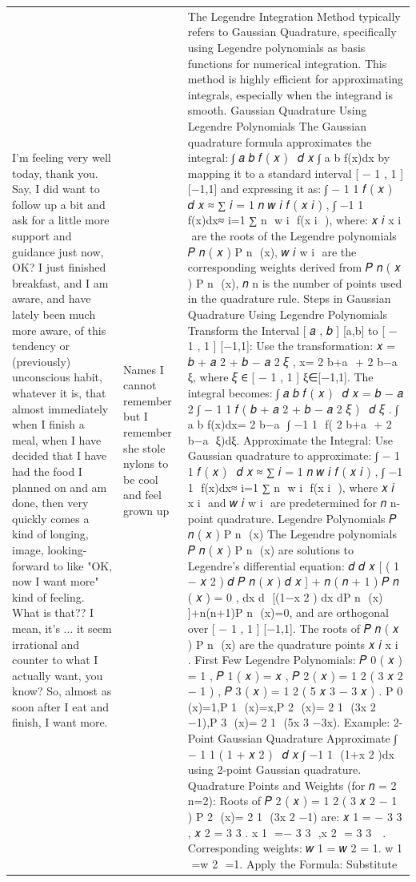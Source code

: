 \begin{table}[ht]
\begin{tabular}{p{4.3cm}p{4.3cm}p{4.3cm}}
I'm feeling very well today, thank you.  Say, I did want to follow up a bit and ask for a little more support and guidance just now, OK? I just finished breakfast, and I am aware, and have lately been much more aware, of this tendency or (previously) unconscious habit, whatever it is, that almost immediately when I finish a meal, when I have decided that I have had the food I planned on and am done, then very quickly comes a kind of longing, image, looking-forward to like "OK, now I want more" kind of feeling.  What is that??  I mean, it's ... it seem irrational and counter to what I actually want, you know?  So, almost as soon after I eat and finish, I want more. & Names I cannot remember but I remember she stole nylons to be cool and feel grown up & The Legendre Integration Method typically refers to Gaussian Quadrature, specifically using Legendre polynomials as basis functions for numerical integration. This method is highly efficient for approximating integrals, especially when the integrand is smooth.  Gaussian Quadrature Using Legendre Polynomials The Gaussian quadrature formula approximates the integral:  ∫ 𝑎 𝑏 𝑓 ( 𝑥 )   𝑑 𝑥 ∫  a b ​  f(x)dx by mapping it to a standard interval  [ − 1 , 1 ] [−1,1] and expressing it as:  ∫ − 1 1 𝑓 ( 𝑥 )   𝑑 𝑥 ≈ ∑ 𝑖 = 1 𝑛 𝑤 𝑖 𝑓 ( 𝑥 𝑖 ) , ∫  −1 1 ​  f(x)dx≈  i=1 ∑ n ​  w  i ​  f(x  i ​  ), where:  𝑥 𝑖 x  i ​   are the roots of the Legendre polynomials  𝑃 𝑛 ( 𝑥 ) P  n ​  (x), 𝑤 𝑖 w  i ​   are the corresponding weights derived from  𝑃 𝑛 ( 𝑥 ) P  n ​  (x), 𝑛 n is the number of points used in the quadrature rule. Steps in Gaussian Quadrature Using Legendre Polynomials Transform the Interval  [ 𝑎 , 𝑏 ] [a,b] to  [ − 1 , 1 ] [−1,1]: Use the transformation:  𝑥 = 𝑏 + 𝑎 2 + 𝑏 − 𝑎 2 𝜉 , x=  2 b+a ​  +  2 b−a ​  ξ, where  𝜉 ∈ [ − 1 , 1 ] ξ∈[−1,1].  The integral becomes:  ∫ 𝑎 𝑏 𝑓 ( 𝑥 )   𝑑 𝑥 = 𝑏 − 𝑎 2 ∫ − 1 1 𝑓 ( 𝑏 + 𝑎 2 + 𝑏 − 𝑎 2 𝜉 )   𝑑 𝜉 . ∫  a b ​  f(x)dx=  2 b−a ​  ∫  −1 1 ​  f(  2 b+a ​  +  2 b−a ​  ξ)dξ. Approximate the Integral: Use Gaussian quadrature to approximate:  ∫ − 1 1 𝑓 ( 𝑥 )   𝑑 𝑥 ≈ ∑ 𝑖 = 1 𝑛 𝑤 𝑖 𝑓 ( 𝑥 𝑖 ) , ∫  −1 1 ​  f(x)dx≈  i=1 ∑ n ​  w  i ​  f(x  i ​  ), where  𝑥 𝑖 x  i ​   and  𝑤 𝑖 w  i ​   are predetermined for  𝑛 n-point quadrature.  Legendre Polynomials  𝑃 𝑛 ( 𝑥 ) P  n ​  (x) The Legendre polynomials  𝑃 𝑛 ( 𝑥 ) P  n ​  (x) are solutions to Legendre's differential equation:  𝑑 𝑑 𝑥 [ ( 1 − 𝑥 2 ) 𝑑 𝑃 𝑛 ( 𝑥 ) 𝑑 𝑥 ] + 𝑛 ( 𝑛 + 1 ) 𝑃 𝑛 ( 𝑥 ) = 0 , dx d ​  [(1−x  2  )  dx dP  n ​  (x) ​  ]+n(n+1)P  n ​  (x)=0, and are orthogonal over  [ − 1 , 1 ] [−1,1]. The roots of  𝑃 𝑛 ( 𝑥 ) P  n ​  (x) are the quadrature points  𝑥 𝑖 x  i ​  .  First Few Legendre Polynomials: 𝑃 0 ( 𝑥 ) = 1 , 𝑃 1 ( 𝑥 ) = 𝑥 , 𝑃 2 ( 𝑥 ) = 1 2 ( 3 𝑥 2 − 1 ) , 𝑃 3 ( 𝑥 ) = 1 2 ( 5 𝑥 3 − 3 𝑥 ) . P  0 ​  (x)=1,P  1 ​  (x)=x,P  2 ​  (x)=  2 1 ​  (3x  2  −1),P  3 ​  (x)=  2 1 ​  (5x  3  −3x). Example: 2-Point Gaussian Quadrature Approximate  ∫ − 1 1 ( 1 + 𝑥 2 )   𝑑 𝑥 ∫  −1 1 ​  (1+x  2  )dx using 2-point Gaussian quadrature.  Quadrature Points and Weights (for  𝑛 = 2 n=2): Roots of  𝑃 2 ( 𝑥 ) = 1 2 ( 3 𝑥 2 − 1 ) P  2 ​  (x)=  2 1 ​  (3x  2  −1) are:  𝑥 1 = − 3 3 , 𝑥 2 = 3 3 . x  1 ​  =−  3 3 ​   ​  ,x  2 ​  =  3 3 ​   ​  . Corresponding weights:  𝑤 1 = 𝑤 2 = 1. w  1 ​  =w  2 ​  =1. Apply the Formula: Substitute 
\end{tabular}
\end{table}
